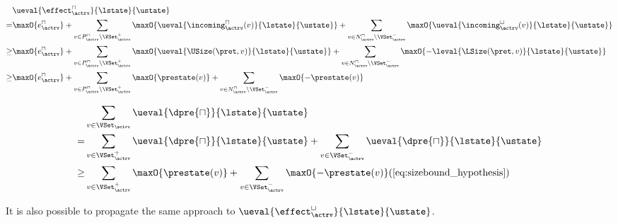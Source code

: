 \begin{equation} \label{eq:input_rv_reduction_upper}
  \begin{split}
  & \ueval{\effect^\sqcap_\actrv}{\lstate}{\ustate} \\
  = & \maxO{e^{\sqcap}_\actrv}
    + \sum_{v \in P_\actrv^\sqcap \setminus \VSet^+_\actrv} \maxO{\ueval{\incoming^\sqcap_\actrv(v)}{\lstate}{\ustate}}
    + \sum_{v \in N_\actrv^\sqcap \setminus \VSet^-_\actrv} \maxO{\ueval{\incoming^\sqcup_\actrv(v)}{\lstate}{\ustate}} \\
  \geq & \maxO{e^{\sqcap}_\actrv}
    + \sum_{v \in P_\actrv^\sqcap \setminus \VSet^+_\actrv} \maxO{\ueval{\USize(\pret, v)}{\lstate}{\ustate}}
    + \sum_{v \in N_\actrv^\sqcap \setminus \VSet^-_\actrv} \maxO{-\leval{\LSize(\pret, v)}{\lstate}{\ustate}} \\
  \geq & \maxO{e^{\sqcap}_\actrv}
    + \sum_{v \in P_\actrv^\sqcap \setminus \VSet^+_\actrv} \maxO{\prestate(v)}
    + \sum_{v \in N_\actrv^\sqcap \setminus \VSet^-_\actrv} \maxO{-\prestate(v)} \\
  \end{split}
\end{equation}

\begin{equation} \label{eq:d_upper_reduction}
  \begin{split} 
  & \sum_{v \in \VSet_\actrv} \ueval{\dpre{\sqcap}}{\lstate}{\ustate} \\
  = & \sum_{v \in \VSet^+_\actrv} \ueval{\dpre{\sqcap}}{\lstate}{\ustate} + \sum_{v \in \VSet^-_\actrv} \ueval{\dpre{\sqcap}}{\lstate}{\ustate} \\
  \geq & \sum_{v \in \VSet^+_\actrv} \maxO{\prestate(v)} + \sum_{v \in \VSet^-_\actrv} \maxO{-\prestate(v)} (\ref{eq:sizebound_hypothesis}) \\
  \end{split}      
\end{equation}

It is also possible to propagate the same approach to $\ueval{\effect^\sqcup_\actrv}{\lstate}{\ustate}$.


